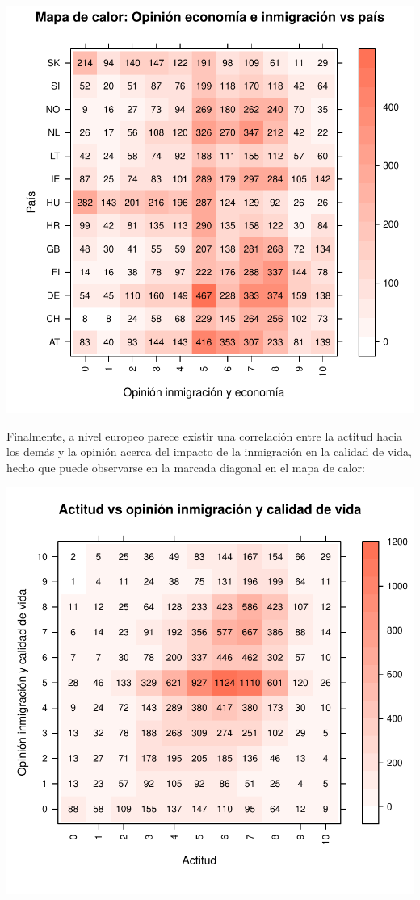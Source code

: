 \documentclass{article}
\begin{document}
\includegraphics{Informe_resultados-004}

Finalmente, a nivel europeo parece existir una correlación entre la actitud hacia los demás y la opinión acerca del impacto de la inmigración en la calidad de vida, hecho que puede observarse en la marcada diagonal en el mapa de calor:

\includegraphics{Informe_resultados-005}
\end{document}

